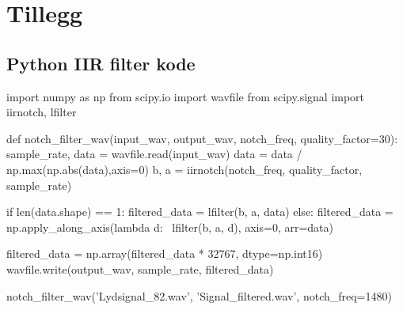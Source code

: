 \appendix

\section{Tillegg}
\label{ekstraGreier}

\subsection{Python IIR filter kode}
\begin{pythoncode}
import numpy as np
from scipy.io import wavfile
from scipy.signal import iirnotch, lfilter

def notch_filter_wav(input_wav, output_wav, notch_freq, quality_factor=30):
    sample_rate, data = wavfile.read(input_wav)
    data = data / np.max(np.abs(data),axis=0)
    b, a = iirnotch(notch_freq, quality_factor, sample_rate)

    if len(data.shape) == 1:
        filtered_data = lfilter(b, a, data)
    else:
        filtered_data = np.apply_along_axis(lambda d: \ 
                            lfilter(b, a, d), axis=0, arr=data)

    filtered_data = np.array(filtered_data * 32767, dtype=np.int16)
    wavfile.write(output_wav, sample_rate, filtered_data)

notch_filter_wav('Lydsignal_82.wav', 'Signal_filtered.wav', notch_freq=1480)
\end{pythoncode}

